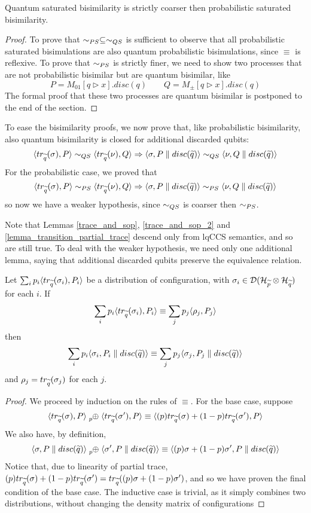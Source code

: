 \begin{theorem}
Quantum saturated bisimilarity is strictly coarser then probabilistic saturated bisimilarity.
\end{theorem}
\begin{proof}
To prove that $\sim_{PS} \subseteq \sim_{QS}$ is sufficient to observe that all probabilistic saturated bisimulations are also quantum probabilistic bisimulations, since $\equiv$ is reflexive. To prove that $\sim_{PS}$ is strictly finer, we need to show two processes that are not probabilistic bisimilar but are quantum bisimilar, like
\[ P = M_{01}[q \rhd x].disc(q) \qquad Q = M_{\pm}[q \rhd x].disc(q)\]  The formal proof that these two processes are quantum bisimilar is postponed to the end of the section.
\end{proof}

To ease the bisimilarity proofs, we now prove that, like probabilistic bisimilarity, also quantum bisimilarity is closed for additional discarded qubits: 
\[\langle tr_{\widetilde{q}}(\sigma), P\rangle \sim_{QS} \langle tr_{\widetilde{q}}(\nu), Q\rangle \Rightarrow \langle\sigma, P\parallel disc(\widetilde{q})\rangle \sim_{QS} \langle\nu, Q\parallel disc(\widetilde{q})\rangle\] 
For the probabilistic case, we proved that \[\langle tr_{\widetilde{q}}(\sigma), P\rangle \sim_{PS} \langle tr_{\widetilde{q}}(\nu), Q\rangle \Rightarrow \langle\sigma, P\parallel disc(\widetilde{q})\rangle \sim_{PS} \langle\nu, Q\parallel disc(\widetilde{q})\rangle\] so now we have a weaker hypothesis, since $\sim_{QS}$ is coarser then $\sim_{PS}$.

Note that Lemmas \ref{trace_and_sop}, \ref{trace_and_sop_2} and \ref{lemma_transition_partial_trace} descend only from lqCCS semantics, and so are still true. To deal with the weaker hypothesis, we need only one additional lemma, saying that  additional discarded qubits preserve the equivalence relation.

\begin{lemma}\label{lemma_quantum_equivalence_partial_trace}
Let $\sum_i p_i \langle tr_{\widetilde{q}}(\sigma_i), P_i\rangle$ be a distribution of configuration, with $\sigma_i \in \mathcal{D}(\mathcal{H}_{\widetilde{p}} \otimes \mathcal{H}_{\widetilde{q}})$ for each $i$.  If \[\sum_i p_i \langle tr_{\widetilde{q}}(\sigma_i), P_i\rangle \equiv \sum_j p_j \langle\rho_j, P_j\rangle\]
then 
\[\sum_i p_i \langle\sigma_i, P_i\parallel disc(\widetilde{q})\rangle \equiv \sum_j p_j \langle\sigma_j, P_j\parallel disc(\widetilde{q})\rangle\]
and $\rho_j = tr_{\widetilde{q}}(\sigma_j)$ for each $j$.
\end{lemma}
\begin{proof}
We proceed by induction on the rules of $\equiv$. For the base case, suppose \[
\confw{\trQ(\sigma), P} \psum{p} \confw{\trQ(\sigma'), P} \equiv \confw{(p)\trQ(\sigma) + (1-p)\trQ(\sigma'), P}\]
We also have, by definition,  \[\confw{\sigma, P\parallel \discQ} \psum{p} \confw{\sigma', P\parallel \discQ} \equiv \confw{(p)\sigma + (1-p)\sigma', P\parallel \discQ}\]
Notice that, due to linearity of partial trace, $(p)tr_{\widetilde{q}}(\sigma) + (1-p)tr_{\widetilde{q}}(\sigma') = tr_{\widetilde{q}}((p)\sigma + (1-p)\sigma')$, and so we have proven the final condition of the base case.
The inductive case is trivial, as it simply combines two distributions, without changing the density matrix of configurations
\end{proof}

